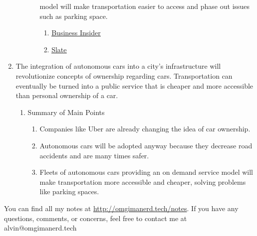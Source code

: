 \documentclass[letterpaper, 12pt]{article}
\begin{document}
\begin{enumerate}
\begin{enumerate}
\begin{enumerate}
        model will make transportation easier to access and phase out issues
        such as parking space.
      \begin{enumerate}
        \item \href{http://www.businessinsider.com/why-no-one-will-own-a-car-in-25-years-2015-6}{\underline{Business Insider}}
        \item \href{http://www.slate.com/articles/technology/future_tense/2016/10/self_driving_cars_effects_on_cities_depend_on_who_owns_them.html}{\underline{Slate}}
      \end{enumerate}
    \end{enumerate}
  \end{enumerate}
  \item The integration of autonomous cars into a city's infrastructure will
    revolutionize concepts of ownership regarding cars. Transportation can
    eventually be turned into a public service that is cheaper and more
    accessible than personal ownership of a car.
  \begin{enumerate}
    \item Summary of Main Points
    \begin{enumerate}
      \item Companies like Uber are already changing the idea of car ownership.
      \item Autonomous cars will be adopted anyway because they decrease road
        accidents and are many times safer.
      \item Fleets of autonomous cars providing an on demand service model will
        make transportation more accessible and cheaper, solving problems like
        parking spaces.
    \end{enumerate}
  \end{enumerate}
\end{enumerate}

\begin{center}
  You can find all my notes at \url{http://omgimanerd.tech/notes}. If you have
  any questions, comments, or concerns, feel free to contact me at
  alvin@omgimanerd.tech
\end{center}
\end{document}
